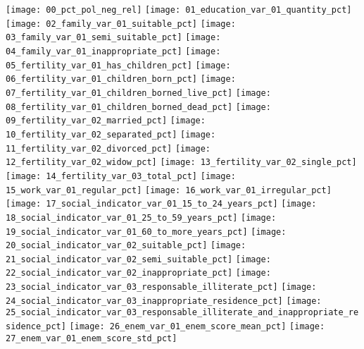 
\label{ape:cap3_scatter_plot}

\graphicspath{ {./figuras/two_by_two_scatter_plot/} }
\texttt{[image: 00\_pct\_pol\_neg\_rel]}
\texttt{[image: 01\_education\_var\_01\_quantity\_pct]}
\texttt{[image: 02\_family\_var\_01\_suitable\_pct]}
\texttt{[image: 03\_family\_var\_01\_semi\_suitable\_pct]}
\texttt{[image: 04\_family\_var\_01\_inappropriate\_pct]}
\texttt{[image: 05\_fertility\_var\_01\_has\_children\_pct]}
\texttt{[image: 06\_fertility\_var\_01\_children\_born\_pct]}
\texttt{[image: 07\_fertility\_var\_01\_children\_borned\_live\_pct]}
\texttt{[image: 08\_fertility\_var\_01\_children\_borned\_dead\_pct]}
\texttt{[image: 09\_fertility\_var\_02\_married\_pct]}
\texttt{[image: 10\_fertility\_var\_02\_separated\_pct]}
\texttt{[image: 11\_fertility\_var\_02\_divorced\_pct]}
\texttt{[image: 12\_fertility\_var\_02\_widow\_pct]}
\texttt{[image: 13\_fertility\_var\_02\_single\_pct]}
\texttt{[image: 14\_fertility\_var\_03\_total\_pct]}
\texttt{[image: 15\_work\_var\_01\_regular\_pct]}
\texttt{[image: 16\_work\_var\_01\_irregular\_pct]}
\texttt{[image: 17\_social\_indicator\_var\_01\_15\_to\_24\_years\_pct]}
\texttt{[image: 18\_social\_indicator\_var\_01\_25\_to\_59\_years\_pct]}
\texttt{[image: 19\_social\_indicator\_var\_01\_60\_to\_more\_years\_pct]}
\texttt{[image: 20\_social\_indicator\_var\_02\_suitable\_pct]}
\texttt{[image: 21\_social\_indicator\_var\_02\_semi\_suitable\_pct]}
\texttt{[image: 22\_social\_indicator\_var\_02\_inappropriate\_pct]}
\texttt{[image: 23\_social\_indicator\_var\_03\_responsable\_illiterate\_pct]}
\texttt{[image: 24\_social\_indicator\_var\_03\_inappropriate\_residence\_pct]}
\texttt{[image: 25\_social\_indicator\_var\_03\_responsable\_illiterate\_and\_inappropriate\_residence\_pct]}
\texttt{[image: 26\_enem\_var\_01\_enem\_score\_mean\_pct]}
\texttt{[image: 27\_enem\_var\_01\_enem\_score\_std\_pct]}
